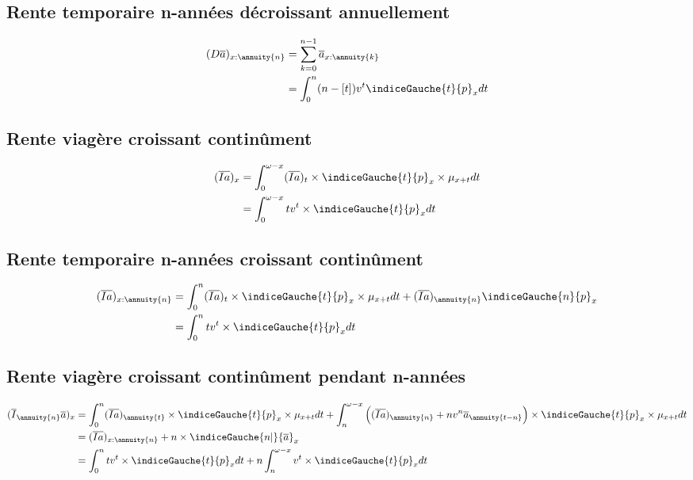 \subsection{Rente temporaire n-années décroissant annuellement}
\begin{align*}
(D\overline{a})_{x:\annuity{n}} &= \sum_{k=0}^{n -1} \overline{a}_{x:\annuity{k}} \\
&= \int_{0}^{n} (n-[t])v^t \indiceGauche{t}{p}_x dt \\
\end{align*}

\subsection{Rente viagère croissant continûment}
\begin{align*}
(\overline{Ia})_x &= \int_{0}^{\omega - x}(\overline{Ia})_t \times \indiceGauche{t}{p}_x \times \mu_{x+t}dt \\
&=  \int_{0}^{\omega - x} t v^t \times \indiceGauche{t}{p}_x dt \\
\end{align*}

\subsection{Rente temporaire n-années croissant continûment}
\begin{align*}
(\overline{Ia})_{x:\annuity{n}} &= \int_{0}^{n}(\overline{Ia})_t \times \indiceGauche{t}{p}_x \times \mu_{x+t}dt + (\overline{Ia})_{\annuity{n}} \indiceGauche{n}{p}_x\\
&=  \int_{0}^{n} t v^t \times \indiceGauche{t}{p}_x dt \\
\end{align*}

\subsection{Rente viagère croissant continûment pendant n-années}
\begin{align*}
(\overline{I}_{\annuity{n}}\overline{a})_{x} &= \int_{0}^{n}(\overline{Ia})_{\annuity{t}} \times \indiceGauche{t}{p}_x \times \mu_{x+t}dt + \int_{n}^{\omega - x}\Big( (\overline{Ia})_{\annuity{n}} + nv^n \overline{a}_{\annuity{t-n}} \Big)\times \indiceGauche{t}{p}_x \times \mu_{x+t}dt \\
&= (\overline{Ia})_{x:\annuity{n}} + n \times \indiceGauche{n|}{\overline{a}}_x \\
&=  \int_{0}^{n} t v^t \times \indiceGauche{t}{p}_x dt + n \int_{n}^{\omega - x}v^t \times \indiceGauche{t}{p}_x dt\\
\end{align*}

